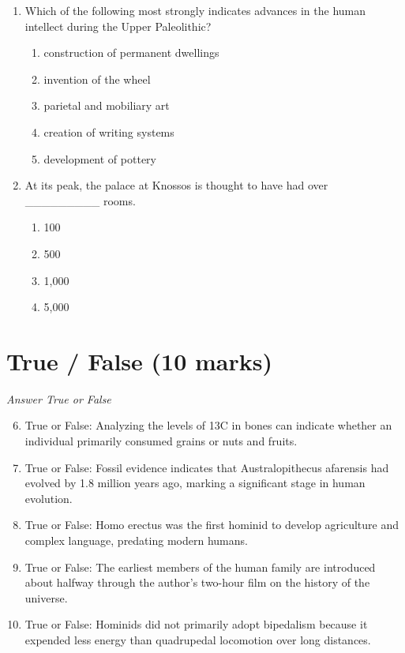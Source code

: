 \documentclass[12pt]{article}
\begin{document}
\begin{enumerate}[label=\arabic*.]
\begin{enumerate}[label=(\alph*)]
\end{enumerate}
\item Which of the following most strongly indicates advances in the human intellect during the
Upper Paleolithic?
\begin{enumerate}[label=(\alph*)]
    \item construction of permanent dwellings
    \item invention of the wheel
    \item parietal and mobiliary art
    \item creation of writing systems
    \item development of pottery
\end{enumerate}
\item At its peak, the palace at Knossos is thought to have had over \_\_\_\_\_\_\_\_\_ rooms.
\begin{enumerate}[label=(\alph*)]
    \item 100
    \item 500
    \item 1,000
    \item 5,000
\end{enumerate}
\end{enumerate}

\section*{True / False (10 marks)}
\textit{Answer True or False}
\begin{enumerate}[label=\arabic*.]
\setcounter{enumi}{5}
\item True or False: Analyzing the levels of 13C in bones can indicate whether an individual primarily consumed grains or nuts and fruits.
\item True or False: Fossil evidence indicates that Australopithecus afarensis had evolved by 1.8 million years ago, marking a significant stage in human evolution.
\item True or False: Homo erectus was the first hominid to develop agriculture and complex language, predating modern humans.
\item True or False: The earliest members of the human family are introduced about halfway through the author's two-hour film on the history of the universe.
\item True or False: Hominids did not primarily adopt bipedalism because it expended less energy than quadrupedal locomotion over long distances.
\end{enumerate}
\end{document}
